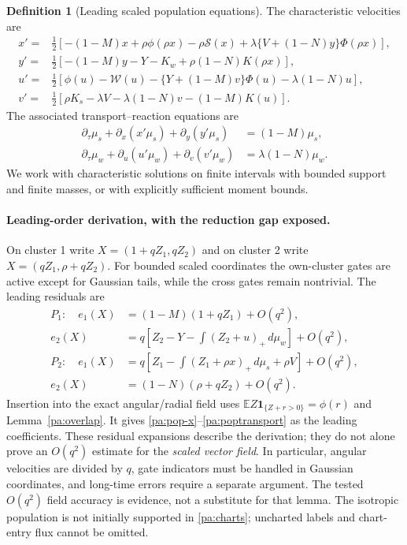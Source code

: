 \documentclass[11pt]{article}
\numberwithin{equation}{section}
\theoremstyle{definition}
\newtheorem{definition}[proposition]{Definition}
\theoremstyle{remark}
\newcommand{\E}{\mathbb E}
\newcommand{\1}{\mathbf 1}
\newcommand{\dd}{\,d}
\begin{document}
\begin{definition}[Leading scaled population equations]\label{pa:leading}
The characteristic velocities are
\begin{align}
 x'={}&\tfrac12[-(1-M)x+\rho\phi(\rho x)-\rho\mathcal S(x)
 +\lambda\{V+(1-N)y\}\Phi(\rho x)],\label{pa:pop-x}\\
 y'={}&\tfrac12[-(1-M)y-Y-K_w+\rho(1-N)K(\rho x)],\label{pa:pop-y}\\
 u'={}&\tfrac12[\phi(u)-\mathcal W(u)-\{Y+(1-M)v\}\Phi(u)
 -\lambda(1-N)u],\label{pa:pop-u}\\
 v'={}&\tfrac12[\rho K_s-\lambda V-\lambda(1-N)v-(1-M)K(u)].\label{pa:pop-v}
\end{align}
The associated transport--reaction equations are
\begin{align}
 \partial_\tau\mu_s+\partial_x(x'\mu_s)+\partial_y(y'\mu_s)&=(1-M)\mu_s,
 \label{pa:poptransport}\\
 \partial_\tau\mu_w+\partial_u(u'\mu_w)+\partial_v(v'\mu_w)&=\lambda(1-N)\mu_w.
 \nonumber
\end{align}
We work with characteristic solutions on finite intervals with bounded
support and finite masses, or with explicitly sufficient moment bounds.
\end{definition}

\paragraph{Leading-order derivation, with the reduction gap exposed.}
On cluster 1 write $X=(1+qZ_1,qZ_2)$ and on cluster 2 write
$X=(qZ_1,\rho+qZ_2)$. For bounded scaled coordinates the own-cluster gates
are active except for Gaussian tails, while the cross gates remain
nontrivial. The leading residuals are
\begin{align*}
 P_1:\quad e_1(X)&=(1-M)(1+qZ_1)+O(q^2),\\
 e_2(X)&=q\left[Z_2-Y-\int(Z_2+u)_+\dd\mu_w\right]+O(q^2),\\
 P_2:\quad e_1(X)&=q\left[Z_1-\int(Z_1+\rho x)_+\dd\mu_s+\rho V\right]+O(q^2),\\
 e_2(X)&=(1-N)(\rho+qZ_2)+O(q^2).
\end{align*}
Insertion into the exact angular/radial field uses
$\E Z\1_{\{Z+r>0\}}=\phi(r)$ and Lemma~\ref{pa:overlap}.
It gives \eqref{pa:pop-x}--\eqref{pa:poptransport} as the leading coefficients.
These residual expansions describe the derivation; they do not alone prove
an $O(q^2)$ estimate for the \emph{scaled vector field}. In particular,
angular velocities are divided by $q$, gate indicators must be handled in
Gaussian coordinates, and long-time errors require a separate argument.
The tested $O(q^2)$ field accuracy is evidence, not a substitute for that lemma.
The isotropic population is not initially supported in \eqref{pa:charts};
uncharted labels and chart-entry flux cannot be omitted.
\end{document}
